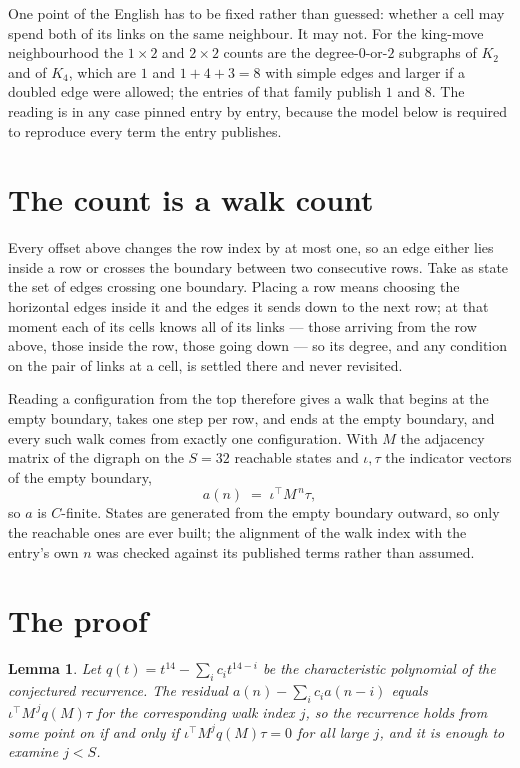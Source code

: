 \documentclass[11pt,a4paper]{article}
\theoremstyle{plain}
\newtheorem{lemma}[theorem]{Lemma}
\theoremstyle{definition}
\begin{document}
One point of the English has to be fixed rather than guessed: whether a cell may spend both of
its links on the same neighbour. It may not. For the king-move neighbourhood the $1\times2$
and $2\times2$ counts are the degree-$0$-or-$2$ subgraphs of $K_2$ and of $K_4$, which are $1$
and $1+4+3=8$ with simple edges and larger if a doubled edge were allowed; the entries of that
family publish $1$ and $8$. The reading is in any case pinned entry by entry, because the
model below is required to reproduce every term the entry publishes.


\section{The count is a walk count}

Every offset above changes the row index by at most one, so an edge either lies inside a row
or crosses the boundary between two consecutive rows. Take as state the set of edges crossing
one boundary. Placing a row means choosing the horizontal edges inside it and the edges it
sends down to the next row; at that moment each of its cells knows all of its links --- those
arriving from the row above, those inside the row, those going down --- so its degree, and any
condition on the pair of links at a cell, is settled there and never revisited.

Reading a configuration from the top therefore gives a walk that begins at the empty boundary,
takes one step per row, and ends at the empty boundary, and every such walk comes from exactly
one configuration. With $M$ the adjacency matrix of the digraph on the $S=32$ reachable
states and $\iota,\tau$ the indicator vectors of the empty boundary,
\[
a(n)\;=\;\iota^{\!\top}M^{\,n}\tau ,
\]
so $a$ is $C$-finite. States are generated from the empty boundary outward, so only the
reachable ones are ever built; the alignment of the walk index with the entry's own $n$ was
checked against its published terms rather than assumed.

\section{The proof}

\begin{lemma}\label{lem:crit}
Let $q(t)=t^{14}-\sum_i c_it^{14-i}$ be the characteristic polynomial of the
conjectured recurrence. The residual $a(n)-\sum_ic_ia(n-i)$ equals
$\iota^{\!\top}M^{\,j}q(M)\tau$ for the corresponding walk index $j$, so the recurrence
holds from some point on if and only if $\iota^{\!\top}M^{j}q(M)\tau=0$ for all large $j$,
and it is enough to examine $j<S$.
\end{lemma}
\end{document}
